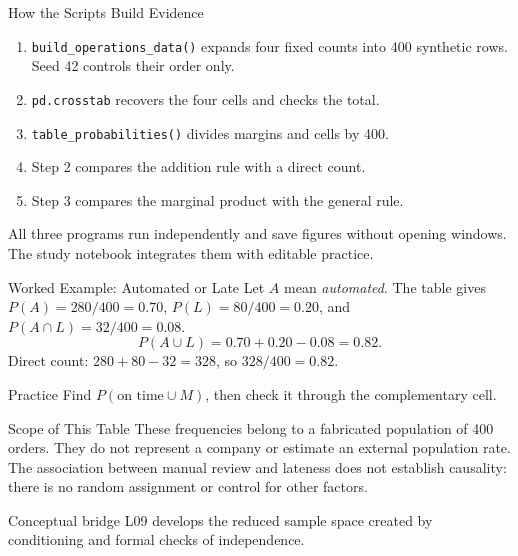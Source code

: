 \documentclass[aspectratio=169,10pt,english]{beamer}
\begin{document}
\begin{frame}{How the Scripts Build Evidence}
  \small
  \begin{enumerate}
    \item \texttt{build\_operations\_data()} expands four fixed counts into
      400 synthetic rows. Seed 42 controls their order only.
    \item \texttt{pd.crosstab} recovers the four cells and checks the total.
    \item \texttt{table\_probabilities()} divides margins and cells by 400.
    \item Step 2 compares the addition rule with a direct count.
    \item Step 3 compares the marginal product with the general rule.
  \end{enumerate}
  All three programs run independently and save figures without opening
  windows. The study notebook integrates them with editable practice.
\end{frame}

\begin{frame}{Worked Example: Automated or Late}
  \small
  Let \(A\) mean \emph{automated}. The table gives
  \(P(A)=280/400=0.70\), \(P(L)=80/400=0.20\), and
  \(P(A\cap L)=32/400=0.08\).
  \[
    P(A\cup L)=0.70+0.20-0.08=0.82.
  \]
  Direct count: \(280+80-32=328\), so \(328/400=0.82\).
  \begin{block}{Practice}
    Find \(P(\text{on time}\cup M)\), then check it through the
    complementary cell.
  \end{block}
\end{frame}

\begin{frame}{Scope of This Table}
  \small
  These frequencies belong to a fabricated population of 400 orders.
  They do not represent a company or estimate an external population rate.
  The association between manual review and lateness does not establish
  causality: there is no random assignment or control for other factors.

  \begin{block}{Conceptual bridge}
    L09 develops the reduced sample space created by conditioning
    and formal checks of independence.
  \end{block}
\end{frame}
\end{document}
